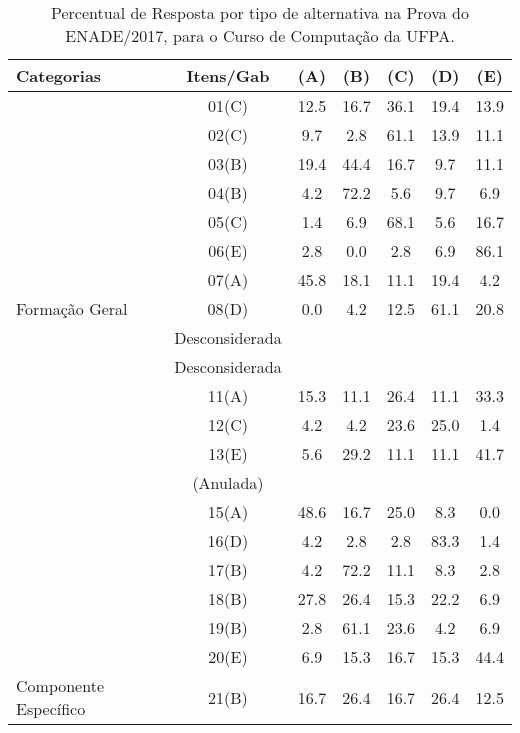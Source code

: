 \documentclass[12pt]{article}
\begin{document}
\begin{table}[h]
	\centering
	\caption{Percentual de Resposta por tipo de alternativa na Prova do ENADE/2017, para o Curso de Computação da UFPA.}
\begin{tabular}{l|c|c|c|c|c|c}
\hline\hline 
Categorias   & Itens/Gab    & (A)   & (B)   & (C)   & (D)   & (E) \\
\hline\hline
               & 01(C)      & 12.5  &  16.7 & 36.1  & 19.4  & 13.9  \\
               & 02(C)      & 9.7   &  2.8  & 61.1  & 13.9  & 11.1   \\
               & 03(B)      & 19.4  &  44.4 & 16.7  & 9.7   & 11.1  \\
               & 04(B)      & 4.2   &  72.2 & 5.6   & 9.7   & 6.9  \\
               & 05(C)      & 1.4   &  6.9  & 68.1  & 5.6   & 16.7   \\
               & 06(E)      & 2.8   &  0.0  & 2.8   & 6.9   & 86.1  \\
               & 07(A)      & 45.8  &  18.1 & 11.1  & 19.4  & 4.2 \\
Formação Geral & 08(D)      & 0.0   &  4.2  & 12.5  & 61.1  & 20.8 \\
               & Desconsiderada      &    &   &  &  &  \\
               & Desconsiderada      &   &   &  &  &  \\
               & 11(A)      & 15.3  &  11.1 & 26.4  & 11.1  & 33.3 \\
               & 12(C)      & 4.2   &  4.2  & 23.6  & 25.0  & 1.4 \\
               & 13(E)      & 5.6   &  29.2 & 11.1  & 11.1  & 41.7 \\
         & (Anulada)      &       &       &       &       &  \\
               & 15(A)      & 48.6  &  16.7 & 25.0  & 8.3   & 0.0 \\
               & 16(D)      & 4.2   &  2.8  &  2.8  & 83.3  & 1.4 \\
               & 17(B)      & 4.2   &  72.2 &  11.1 & 8.3   & 2.8 \\
               & 18(B)      & 27.8  &  26.4 &  15.3 & 22.2  & 6.9 \\
               & 19(B)      & 2.8   &  61.1 &  23.6 & 4.2   & 6.9 \\
               & 20(E)      & 6.9   &  15.3 &  16.7 & 15.3  & 44.4 \\
Componente Específico    
               & 21(B)      & 16.7  &  26.4 &  16.7 & 26.4  & 12.5 \\

\end{tabular}
\end{table}
\end{document}
